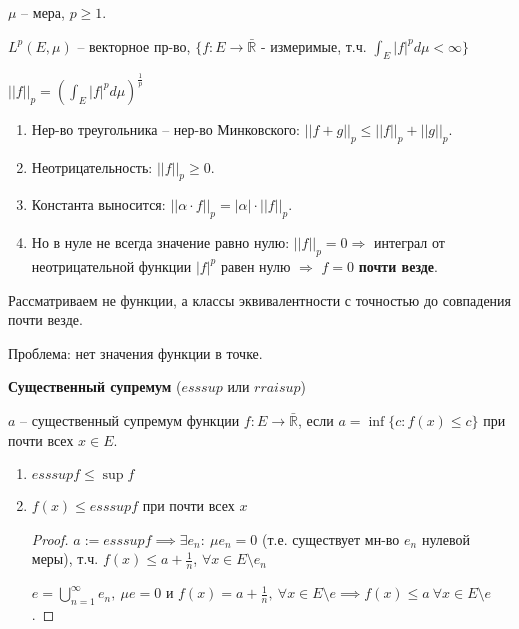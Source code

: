 
\begin{definition}
    $\mu$ -- мера, $p \geq 1$.

    $L^{p} (E, \mu)$ -- векторное пр-во, $\{f : E \rightarrow \bar{\mathbb{R}}$ - измеримые, т.ч. $\int_{E} |f|^p d\mu < \infty\}$

    $|| f ||_p = \left( \int_{E} |f|^p d\mu \right)^{\frac{1}{p}}$

    \begin{enumerate}
        \item Нер-во треугольника -- нер-во Минковского: $||f+g||_p \leq ||f||_p + ||g||_p$.
        \item Неотрицательность: $|| f ||_{p} \geq 0$.
        \item Константа выносится: $|| \alpha \cdot f ||_p = |\alpha| \cdot ||f||_p$.
        \item Но в нуле не всегда значение равно нулю: $||f||_p = 0 \Rightarrow$ интеграл от неотрицательной функции $|f|^p$ равен нулю $\Rightarrow$ $f = 0$ \textbf{почти везде}.
    \end{enumerate}

    Рассматриваем не функции, а классы эквивалентности с точностью до совпадения почти везде.

    Проблема: нет значения функции в точке.
\end{definition}

\begin{definition}
    \textbf{Существенный супремум} ($esssup$ или $rraisup$)

    $a$ -- существенный супремум функции $f: E \rightarrow \bar{\mathbb{R}}$, если $a = \inf \{ c : f(x) \leq c \}$ при почти всех $x \in E$.
\end{definition}

\begin{properties}
    \begin{enumerate}
        \item $esssup f \leq \sup f$
        \item {
            $f(x) \leq esssup f$ при почти всех $x$

            \begin{proof}
                $a := esssup f \implies \exists e_n : \ \mu e_n = 0$ (т.е. существует мн-во $e_n$ нулевой меры), т.ч. $f(x) \leq a + \frac{1}{n}$, $\forall x \in E \setminus e_n$

                $e = \bigcup_{n=1}^{\infty} e_n, \ \mu e = 0$ и $f(x) = a + \frac{1}{n}, \ \forall x \in E \setminus e \implies f(x) \leq a \ \forall x \in E \setminus e$.
            \end{proof}
        }
    \end{enumerate}
\end{properties}

